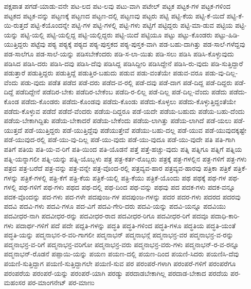 {ಪಕ್ಷಪಾತ
ಪಗಡೆ-ಯಾಡು-ವನೇ
ಪಟ-ಲದ
ಪಟ-ಲವು
ಪಟು-ವಾಗಿ
ಪಟೇಲ್
ಪಟ್ಟಕ
ಪಟ್ಟಕ-ಗಳ
ಪಟ್ಟಕ-ಗಳಿಂದ
ಪಟ್ಟಕದ
ಪಟ್ಟಕ-ವನ್ನು
ಪಟ್ಟಣಕ್ಕೆ
ಪಟ್ಟಣದ
ಪಟ್ಟಣ-ದಲ್ಲಿ
ಪಟ್ಟಣವು
ಪಟ್ಟರು
ಪಟ್ಟಿ
ಪಟ್ಟಿ-ಕೆಯ
ಪಟ್ಟಿ-ಕೆ-ಯಿದೆ
ಪಟ್ಟಿ-ಕೆ-ಯಿ-ರುತ್ತದೆ
ಪಟ್ಟಿ-ಕೆಯೊಂದನ್ನೇ
ಪಟ್ಟಿ-ಗಳ
ಪಟ್ಟಿ-ಗಳಲ್ಲಿ
ಪಟ್ಟಿ-ಗಳು
ಪಟ್ಟಿಗೆ
ಪಟ್ಟಿದ್ದರು
ಪಟ್ಟಿ-ಮಾ-ಡುವ
ಪಟ್ಟಿಯ
ಪಟ್ಟಿ-ಯನ್ನು
ಪಟ್ಟಿ-ಯಲ್ಲಿ
ಪಟ್ಟಿ-ಯಲ್ಲಿದ್ದ
ಪಟ್ಟಿ-ಯಲ್ಲಿದ್ದರು
ಪಟ್ಟಿ-ಯಿದೆ
ಪಟ್ಟಿಯೂ
ಪಟ್ಟು
ಪಟ್ಟು-ಕೊಂಡರು
ಪಟ್ಟು-ಹಿಡಿ-ಯುತ್ತಿದ್ದರು
ಪಟ್ಟೆವು
ಪಠ್ಯ
ಪಠ್ಯಕ್ಕೆ
ಪಠ್ಯದ
ಪಠ್ಯ-ಪುಸ್ತಕದ
ಪಠ್ಯ-ಪುಸ್ತಕ-ವಾಗಿ
ಪಡ-ಬಹು-ದಾಗಿತ್ತು
ಪಡ-ಸಾಲೆ-ಗಳೆದ್ದವು
ಪಡ-ಸಾಲೆಗೂ
ಪಡ-ಸಾಲೆ-ಯನ್ನು
ಪಡಿಸಬೇಕೆಂದರು
ಪಡಿ-ಸ-ಲಾ-ಯಿತು
ಪಡಿ-ಸಲು
ಪಡಿಸಿ
ಪಡಿಸಿ-ಕೊಳ್ಳುವುದು
ಪಡಿಸಿದ
ಪಡಿಸಿ-ದರು
ಪಡಿಸಿ-ದವು
ಪಡಿಸಿ-ದೆವು
ಪಡಿಸಿದ್ದ
ಪಡಿಸಿದ್ದೀರಿ
ಪಡಿಸಿದ್ದೇನೆ
ಪಡಿಸಿ-ರು-ವುದು
ಪಡಿ-ಸುತ್ತಿದ್ದಾರೆ
ಪಡುತ್ತಾರೆ
ಪಡುತ್ತಿದ್ದರು
ಪಡುತ್ತಿದ್ದೆ
ಪಡುತ್ತಿರ-ಬಹುದು
ಪಡುವ
ಪಡು-ವಂತೆಯೇ
ಪಡುವ-ವರೂ
ಪಡು-ವು-ದಿಲ್ಲ-ವೆಂದು
ಪಡು-ವುದು
ಪಡೆತ
ಪಡೆದ
ಪಡೆ-ದರು
ಪಡೆದ-ವ-ರಲ್ಲಿ
ಪಡೆ-ದವು
ಪಡೆ-ದಾಗ
ಪಡೆ-ದಿದ್ದ
ಪಡೆ-ದಿದ್ದರು
ಪಡೆ-ದಿದ್ದೆ
ಪಡೆದಿದ್ದೇನೆ
ಪಡೆದಿರ-ಬೇಕು
ಪಡೆದಿರ-ಬೇಕೆಂಬ
ಪಡೆದಿ-ರ-ಲಿಲ್ಲ
ಪಡೆ-ದಿಲ್ಲ
ಪಡೆ-ದಿಲ್ಲ-ವೆಂದು
ಪಡೆದು
ಪಡೆದು-ಕೊಂಡ
ಪಡೆದು-ಕೊಂಡರು
ಪಡೆದು-ಕೊಂಡವು
ಪಡೆದು-ಕೊಂಡು
ಪಡೆದು-ಕೊಳ್ಳಲು
ಪಡೆದು-ಕೊಳ್ಳುತ್ತಿದ್ದಂತೆಯೇ
ಪಡೆದು-ಕೊಳ್ಳುವ
ಪಡೆದೆ
ಪಡೆದೆ-ವೆಂದರು
ಪಡೆಯ-ದಿದ್ದರೂ
ಪಡೆ-ಯದೇ
ಪಡೆಯ-ಬಹುದು
ಪಡೆಯ-ಬಹು-ದೆಂದು
ಪಡೆಯ-ಬೇಕಾಗಿದ್ದಿತು
ಪಡೆಯ-ಬೇಕಾದರೆ
ಪಡೆಯ-ಬೇಕೆಂದು
ಪಡೆಯ-ಲಾಗಿತ್ತು
ಪಡೆಯ-ಲಾಗಿದೆ
ಪಡೆ-ಯಲು
ಪಡೆ-ಯುತ್ತದೆ
ಪಡೆ-ಯುತ್ತಿದ್ದರು
ಪಡೆ-ಯುತ್ತಿದ್ದೆವು
ಪಡೆಯುತ್ತೇವೆ
ಪಡೆಯು-ಬಹು-ದಲ್ಲ
ಪಡೆ-ಯುವ
ಪಡೆ-ಯುವುದಕ್ಕಷ್ಟೇ
ಪಡೆ-ಯುವುದ-ರಲ್ಲಿ
ಪಡೆ-ಯು-ವು-ದಿಲ್ಲ
ಪಡೆ-ಯು-ವುದು
ಪಡೆ-ಯು-ವುದೂ
ಪಡೆ-ಯು-ವುದೇ
ಪತಿ
ಪತಿ-ಗಾಗಿ
ಪತಿಗೆ
ಪತಿಯ
ಪತಿ-ಯ-ವ-ರಿಗೆ
ಪತಿ-ಯಿಂದ
ಪತಿ-ಯೊಡನೆ
ಪತ್ತೆ
ಪತ್ತೆ-ಹಚ್ಚು-ವುದು
ಪತ್ನಿ
ಪತ್ನಿಗೂ
ಪತ್ನಿಗೆ
ಪತ್ನಿಯ
ಪತ್ನಿ-ಯನ್ನಾಗಲೀ
ಪತ್ನಿ-ಯನ್ನು
ಪತ್ನಿ-ಯೊಬ್ಬಳು
ಪತ್ರ
ಪತ್ರ-ಕರ್ತ-ರೊಬ್ಬರು
ಪತ್ರಕ್ಕೆ
ಪತ್ರ-ಗಳಲ್ಲಿನ
ಪತ್ರ-ಗಳಿಗೆ
ಪತ್ರ-ಗಳು
ಪತ್ರದ
ಪತ್ರ-ಬರೆದೆ
ಪತ್ರ-ವನ್ನು
ಪತ್ರ-ವನ್ನೇ
ಪತ್ರ-ವೊಂದ-ರಲ್ಲಿ
ಪತ್ರವ್ಯವ-ಹಾರ
ಪತ್ರವ್ಯವ-ಹಾರವು
ಪತ್ರಿಕಾ
ಪತ್ರಿಕೆ
ಪತ್ರಿಕೆ-ಗಳನ್ನು
ಪತ್ರಿಕೆ-ಗಳಲ್ಲಿ
ಪತ್ರಿ-ಕೆಗೆ
ಪತ್ರಿ-ಕೆಯ
ಪತ್ರಿಕೆ-ಯಲ್ಲಿ
ಪತ್ರಿ-ಕೆಯು
ಪತ್ರಿಕೆ-ಯೊಂದು
ಪಥ
ಪಥಕ್ಕೆ
ಪಥ-ಗಳ
ಪಥ-ಗಳಲ್ಲಿ
ಪಥ-ಗಳಿಗೆ
ಪಥ-ಗಳು
ಪಥದ
ಪಥ-ದಲ್ಲಿ
ಪಥ-ದಿಂದ
ಪಥ-ವನ್ನು
ಪಥವು
ಪದ
ಪದಕ-ಗಳು
ಪದಕ-ವನ್ನೂ
ಪದಕ-ವೊಂದನ್ನು
ಪದ-ಗಳು
ಪದ-ಗಳೇ
ಪದಪುಂಜ-ಗಳ
ಪದಪುಂಜ-ಗಳನ್ನು
ಪದರ
ಪದರ-ಗಳು
ಪದರದ
ಪದರವು
ಪದವಿ
ಪದವಿ-ಗಳು
ಪದವಿ-ಗಳೂ
ಪದ-ವಿಗೆ
ಪದವಿ-ಗೇರಿ-ದರು
ಪದವಿ-ಯನ್ನು
ಪದವಿ-ಯನ್ನೂ
ಪದವಿಯು
ಪದವೀಧರ-ನಾಗಿ
ಪದವೀಧರ-ರನ್ನು
ಪದವೀಧರ-ರಾದ
ಪದವೀಧರ-ರಿಗೂ
ಪದವೀಧರ-ರಿಗೆ
ಪದವೂ
ಪದಾಧಿ-ಕಾರಿ-ಗಳು
ಪದಾರ್ಥ-ಗಳಿಗೆ
ಪದೆ
ಪದೇ
ಪದ್ದತಿ-ಗಳನ್ನು
ಪದ್ಧತಿ
ಪದ್ಧತಿ-ಗಳಿಂದ
ಪದ್ಧತಿ-ಗಳೂ
ಪದ್ಧತಿಯ
ಪದ್ಧತಿ-ಯಂತೆ
ಪದ್ಧತಿ-ಯನ್ನು
ಪದ್ಮನಾಭನ-ರ-ವರಿ-ಗಾಗಲೀ
ಪದ್ಮನಾಭನ್
ಪದ್ಮನಾಭನ್ಗೆ
ಪದ್ಮನಾಭನ್ರ-ವರ
ಪದ್ಮನಾಭನ್ರ-ವ-ರನ್ನು
ಪದ್ಮನಾಭನ್ರ-ವ-ರಿಗೆ
ಪದ್ಮನಾಭನ್ರ-ವರಿಗೋ
ಪದ್ಮನಾಭನ್ರ-ವರು
ಪದ್ಮನಾಭನ್ರ-ವರು-ಗಳು
ಪದ್ಮನಾಭನ್-ರ-ವ-ರನ್ನೂ
ಪದ್ಮನಾಭನ್-ರೊಡನೆ
ಪಪ್ಪಾಯಿ-ಯನ್ನು
ಪಯಣ
ಪಯಣ-ದಲ್ಲಿ
ಪಯಣ-ದಿಂದ
ಪಯಣಿ-ಸಿದರು
ಪಯಣಿಸಿ-ದೆವು
ಪಯಣಿ-ಸುತ್ತಿದ್ದಾಗ
ಪಯಣಿ-ಸುತ್ತಿದ್ದಾಗಲೇ
ಪಯಣಿ-ಸುವ
ಪರ
ಪರಂಪರೆ-ಗಳಾಗಿ
ಪರಂಪರೆ-ಗಳಿಗೆ
ಪರಂಪರೆಗೂ
ಪರಂಪರೆಯ
ಪರಂಪರೆ-ಯನ್ನು
ಪರಂಪರೆ-ಯಾಗಿ
ಪರಡ್ಯು
ಪರದಾಡಬೇಕಾಗಿಲ್ಲ
ಪರದಾಡ-ಬೇಕಾದ
ಪರದೆಯ
ಪರ-ಮಹಂಸರ
ಪರ-ಮಾಂಗನೇಟ್
ಪರ-ಮಾಣು
}
